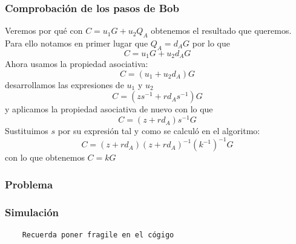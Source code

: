 \documentclass[spanish,9pt]{beamer}
\begin{document}
\begin{frame}\frametitle{Comprobación de los pasos de Bob}
Veremos por qué con $C=u_1G+u_2Q_A$ obtenemos el resultado que queremos. Para ello notamos en primer lugar que $Q_A=d_AG$ por lo que
$$C=u_1G+u_2d_AG$$
Ahora usamos la propiedad asociativa:
$$C = (u_1+u_2d_A)G$$
desarrollamos las expresiones de $u_1$ y $u_2$
$$C = (zs^{-1}+rd_As^{-1})G$$
y aplicamos la propiedad asociativa de nuevo con lo que
$$C = (z+rd_A)s^{-1}G$$
Sustituimos $s$ por su expresión tal y como se calculó en el
algoritmo:
$$C = (z+rd_A)(z+rd_A)^{-1}(k^{-1})^{-1}G$$
con lo que obtenemos $C = kG$
\end{frame}

\begin{frame}\frametitle{Problema}
\end{frame}

\begin{frame}\frametitle{}
\end{frame}

\begin{frame}[fragile]\frametitle{Simulación}
  \begin{lstlisting}
    Recuerda poner fragile en el cógigo
  \end{lstlisting}
\end{frame}
\end{document}
